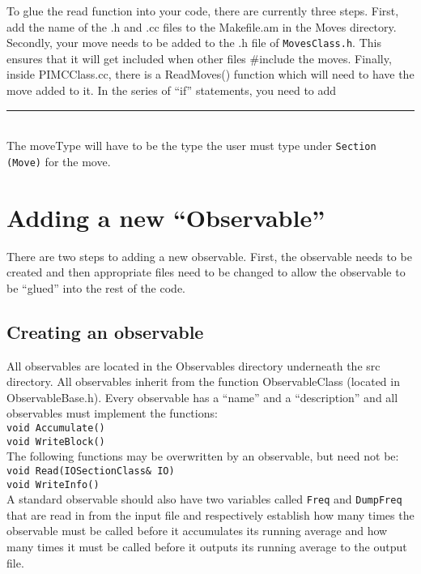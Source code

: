 \documentclass{book}
\begin{document}
To glue the read function into your code, there are currently three
steps. First, add the name of the .h and .cc files to the Makefile.am in the Moves directory. 
Secondly,  your move needs
to be added to the .h file of \texttt{MovesClass.h}. This ensures that it will
get included when other files \#include the moves. Finally, inside
PIMCClass.cc, there is a ReadMoves() function which will need to have the
move added to it.  In the series of ``if'' statements, you need to add
\rule{0.6cm}{0cm}\\
The moveType will have to be the type the user must type under
\texttt{Section (Move)} for the move.





\section{Adding a new ``Observable''}
There are two steps to adding a new observable. First, the observable
needs to be created and then appropriate files need to be changed to
allow the observable to be ``glued'' into the rest of the code.
\subsection{Creating an observable}
All observables are located in the Observables directory underneath
the src directory. All observables inherit from the function
ObservableClass (located in ObservableBase.h). Every observable has a
``name'' and a ``description'' and all
observables must implement the functions: \\
\texttt{void Accumulate()} \\
\texttt{void WriteBlock()} \\ 
The following functions may be overwritten by an observable, but need
not be: \\
\texttt{void Read(IOSectionClass\& IO)} \\
\texttt{void WriteInfo()} \\
A standard observable should also have two variables called \texttt{Freq} and
\texttt{DumpFreq} that are read in from the input file and respectively
establish how many times the observable must be called before it
accumulates its running average and how many times it must be called
before it outputs its running average to the output file.
\end{document}

